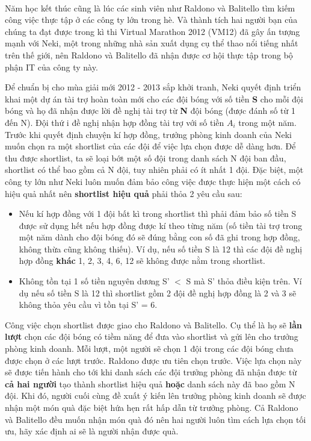 

 

Năm học kết thúc cũng là lúc các sinh viên như Raldono và Balitello tìm kiếm công việc thực tập ở các công ty lớn trong hè. Và thành tích hai người bạn của chúng ta đạt được trong kì thi Virtual Marathon 2012 (VM12) đã gây ấn tượng mạnh với Neki, một trong những nhà sản xuất dụng cụ thể thao nổi tiếng nhất trên thế giới, nên Raldono và Balitello đã nhận được cơ hội thực tập trong bộ phận IT của công ty này.

Để chuẩn bị cho mùa giải mới 2012 - 2013 sắp khởi tranh, Neki quyết định triển khai một dự án tài trợ hoàn toàn mới cho các đội bóng với số tiền \textbf{ S } cho mỗi đội bóng và họ đã nhận được lời đề nghị tài trợ từ \textbf{ N } đội bóng (được đánh số từ 1 đến N). Đội thứ i đề nghị nhận hợp đồng tài trợ với số tiền \textbf{ $A_{i}$} trong một năm. Trước khi quyết định chuyện kí hợp đồng, trưởng phòng kinh doanh của Neki muốn chọn ra một shortlist của các đội để việc lựa chọn được dễ dàng hơn. Để thu được shortlist, ta sẽ loại bớt một số đội trong danh sách N đội ban đầu, shortlist có thể bao gồm cả N đội, tuy nhiên phải có ít nhất 1 đội. Đặc biệt, một công ty lớn như Neki luôn muốn đảm bảo công việc được thực hiện một cách có hiệu quả nhất nên \textbf{ shortlist hiệu quả } phải thỏa 2 yêu cầu sau:
\begin{itemize}
	\item Nếu kí hợp đồng với 1 đội bất kì trong shortlist thì phải đảm bảo số tiền S được sử dụng hết nếu hợp đồng được kí theo từng năm (số tiền tài trợ trong một năm dành cho đội bóng đó sẽ đúng bằng con số đã ghi trong hợp đồng, không thừa cũng không thiếu). Ví dụ, nếu số tiền S là 12 thì các đội đề nghị hợp đồng \textbf{ khác } 1, 2, 3, 4, 6, 12 sẽ không được nằm trong shortlist.
\end{itemize}
\begin{itemize}
	\item Không tồn tại 1 số tiền nguyên dương S' $<$ S mà S' thỏa điều kiện trên. Ví dụ nếu số tiền S là 12 thì shortlist gồm 2 đội đề nghị hợp đồng là 2 và 3 sẽ không thỏa yêu cầu vì tồn tại S' = 6.
\end{itemize}

Công việc chọn shortlist được giao cho Raldono và Balitello. Cụ thể là họ sẽ \textbf{ lần lượt } chọn các đội bóng có tiềm năng để đưa vào shortlist và gửi lên cho trưởng phòng kinh doanh. Mỗi lượt, một người sẽ chọn 1 đội trong các đội bóng chưa được chọn ở các lượt trước. Raldono được ưu tiên chọn trước. Việc lựa chọn này sẽ được tiến hành cho tới khi danh sách các đội trưởng phòng đã nhận được từ \textbf{ cả hai người } tạo thành shortlist hiệu quả \textbf{ hoặc } danh sách này đã bao gồm N đội. Khi đó, người cuối cùng đề xuất ý kiến lên trưởng phòng kinh doanh sẽ được nhận một món quà đặc biệt hứa hẹn rất hấp dẫn từ trưởng phòng. Cả Raldono và Balitello đều muốn nhận món quà đó nên hai người luôn tìm cách lựa chọn tối ưu, hãy xác định ai sẽ là người nhận được quà.

